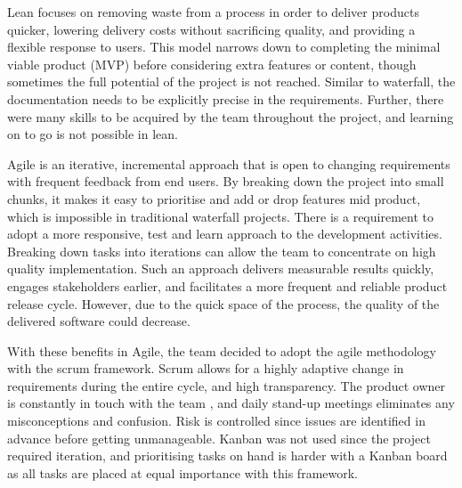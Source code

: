 Lean focuses on removing waste from a process in order to deliver products quicker, lowering delivery costs without sacrificing quality, and providing a flexible response to users. This model narrows down to completing the minimal viable product (MVP) before considering extra features or content, though sometimes the full potential of the project is not reached. Similar to waterfall, the documentation needs to be explicitly precise in the requirements. Further, there were many skills to be acquired by the team throughout the project, and learning on to go is not possible in lean.

Agile is an iterative, incremental approach that is open to changing requirements with frequent feedback from end users. By breaking down the project into small chunks, it makes it easy to prioritise and add or drop features mid product, which is impossible in traditional waterfall projects. There is a requirement to adopt a more responsive, test and learn approach to the development activities. Breaking down tasks into iterations can allow the team to concentrate on high quality implementation. Such an approach delivers measurable results quickly, engages stakeholders earlier, and facilitates a more frequent and reliable product release cycle. However, due to the quick space of the process, the quality of the delivered software could decrease.

With these benefits in Agile, the team decided to adopt the agile methodology with the scrum framework. Scrum allows for a highly adaptive change in requirements during the entire cycle, and high transparency. The product owner is constantly in touch with the team \cite{globalluxsoft}, and daily stand-up meetings eliminates any misconceptions and confusion. Risk is controlled since issues are identified in advance before getting unmanageable. Kanban was not used since the project required iteration, and prioritising tasks on hand is harder with a Kanban board as all tasks are placed at equal importance with this framework.

